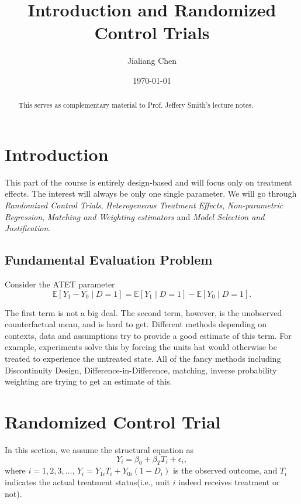 \documentclass[11pt,a4paper]{amsart}
\theoremstyle{plain}
\theoremstyle{definition}
\begin{document}
\title{Introduction and Randomized Control Trials}
\author{Jialiang Chen} 
\date{\today}
		
\begin{abstract}
	This serves as complementary material to Prof. Jeffery Smith's lecture notes.
\end{abstract}
		
\maketitle
\tableofcontents
\newpage

\section{Introduction}

This part of the course is entirely design-based and will focus only on treatment effects. The interest will always be only one single parameter. We will go through \textit{Randomized Control Trials}, \textit{Heterogeneous Treatment Effects}, \textit{Non-parametric Regression}, \textit{Matching and Weighting estimators} and \textit{Model Selection and Justification}. 

\subsection{Fundamental Evaluation Problem}\hfil\par 
Consider the ATET parameter
\[	\mathbb{E}[Y_{1} - Y_{0} \mid D = 1] =  \mathbb{E}[Y_{1} \mid D = 1] - \mathbb{E}[Y_{0} \mid D = 1]. 	\]

The first term is not a big deal. The second term, however, is the unobserved counterfactual mean, and is hard to get. Different methods depending on contexts, data and assumptions try to provide a good estimate of this term. For example, experiments solve this by forcing the units hat would otherwise be treated to experience the untreated state. All of the fancy methods including Discontinuity Design, Difference-in-Difference, matching, inverse probability weighting are trying to get an estimate of this.

\section{Randomized Control Trial}

In this section, we assume the structural equation as 
\[	Y_{i} = \beta_{0} + \beta_{T} T_{i} + \epsilon_{i},	\]
where $ i = 1, 2, 3, \dots$, $Y_{i} = Y_{1i} T_{i} + Y_{0i} (1 - D_{i})$ is the observed outcome, and $T_{i}$ indicates the actual treatment status(i.e., unit $i$ indeed receives treatment or not).
\end{document}
